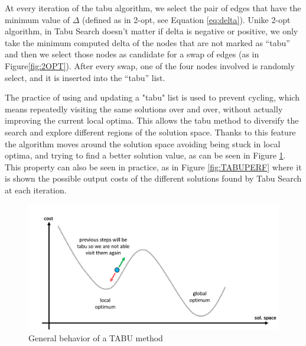 At every iteration of the tabu algorithm, we select the pair of edges that have the minimum value of $\Delta$ (defined as in 2-opt, see Equation \ref{eq:delta}). Unike 2-opt algorithm, in Tabu Search doesn't matter if delta is negative or positive, we only take the minimum computed delta of the nodes that are not marked as “tabu” and then we select those nodes as candidate for a swap of edges (as in Figure\ref{fig:2OPT}).  After every swap, one of the four nodes involved is randomly select, and it is inserted into the “tabu” list.

The practice of using and updating a "tabu" list is used to prevent cycling, which means repeatedly visiting the same solutions over and over, without actually improving the current local optima. This allows the tabu method to diversify the search and explore different regions of the solution space. Thanks to this feature the algorithm moves around the solution space avoiding being stuck in local optima, and trying to find a better solution value, as can be seen in Figure \ref{fig:TABU}. This property can also be seen in practice, as in Figure \ref{fig:TABUPERF} where it is shown the possible output costs of the different solutions found by Tabu Search at each iteration.

\begin{figure}[!h]
    \centering
    \includegraphics[width = \textwidth]{images/tabu.png}
    \caption{General behavior of a TABU method}
    \label{fig:TABU}
\end{figure}


